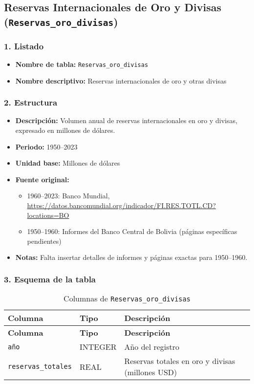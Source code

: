 \documentclass[12pt,a4paper]{article}
\begin{document}
\newpage
\subsection{Reservas Internacionales de Oro y Divisas (\texttt{Reservas\_oro\_divisas})}

\subsubsection*{1. Listado}
\begin{itemize}
  \item \textbf{Nombre de tabla:} \texttt{Reservas\_oro\_divisas}
  \item \textbf{Nombre descriptivo:} Reservas internacionales de oro y otras divisas
\end{itemize}

\subsubsection*{2. Estructura}
\begin{itemize}
  \item \textbf{Descripción:} Volumen anual de reservas internacionales en oro y divisas, expresado en millones de dólares.
  \item \textbf{Periodo:} 1950--2023
  \item \textbf{Unidad base:} Millones de dólares
  \item \textbf{Fuente original:}
    \begin{itemize}
      \item 1960--2023: Banco Mundial, \url{https://datos.bancomundial.org/indicador/FI.RES.TOTL.CD?locations=BO}
      \item 1950--1960: Informes del Banco Central de Bolivia (páginas específicas pendientes)
    \end{itemize}
  \item \textbf{Notas:} Falta insertar detalles de informes y páginas exactas para 1950–1960.
\end{itemize}

\subsubsection*{3. Esquema de la tabla}
\begin{longtable}{@{}lll@{}}
\caption{Columnas de \texttt{Reservas\_oro\_divisas}}\\
\toprule
\textbf{Columna}       & \textbf{Tipo} & \textbf{Descripción} \\
\midrule
\endfirsthead
\toprule
\textbf{Columna}       & \textbf{Tipo} & \textbf{Descripción} \\
\midrule
\endhead
\bottomrule
\endfoot
\texttt{año}             & INTEGER & Año del registro \\
\texttt{reservas\_totales} & REAL    & Reservas totales en oro y divisas (millones USD) \\
\end{longtable}
\end{document}

